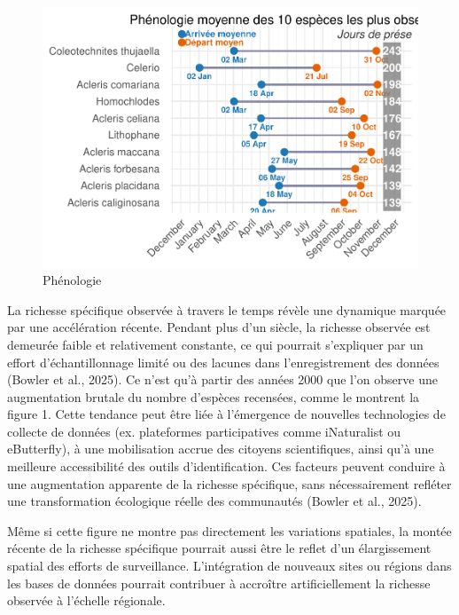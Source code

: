 \documentclass[9pt,twocolumn,twoside,]{pnas-new}
\begin{document}
\begin{figure}

{\centering \includegraphics[width=1\linewidth]{rapport_final_BIO500_files/figure-latex/fig:fig_phenologie-1} 

}

\caption{\label{fig:fig_phenologie}Phénologie}\label{fig:fig:fig_phenologie}
\end{figure}

La richesse spécifique observée à travers le temps révèle une dynamique
marquée par une accélération récente. Pendant plus d'un siècle, la
richesse observée est demeurée faible et relativement constante, ce qui
pourrait s'expliquer par un effort d'échantillonnage limité ou des
lacunes dans l'enregistrement des données (Bowler et al., 2025). Ce
n'est qu'à partir des années 2000 que l'on observe une augmentation
brutale du nombre d'espèces recensées, comme le montrent la figure 1.
Cette tendance peut être liée à l'émergence de nouvelles technologies de
collecte de données (ex. plateformes participatives comme iNaturalist ou
eButterfly), à une mobilisation accrue des citoyens scientifiques, ainsi
qu'à une meilleure accessibilité des outils d'identification. Ces
facteurs peuvent conduire à une augmentation apparente de la richesse
spécifique, sans nécessairement refléter une transformation écologique
réelle des communautés (Bowler et al., 2025).

Même si cette figure ne montre pas directement les variations spatiales,
la montée récente de la richesse spécifique pourrait aussi être le
reflet d'un élargissement spatial des efforts de surveillance.
L'intégration de nouveaux sites ou régions dans les bases de données
pourrait contribuer à accroître artificiellement la richesse observée à
l'échelle régionale.
\end{document}
